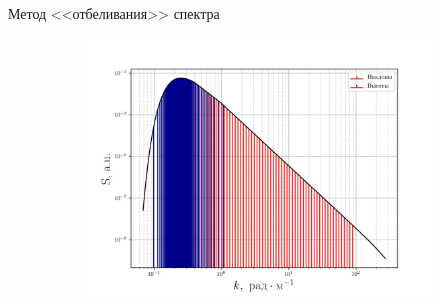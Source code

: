 \documentclass[10pt,pdf,hyperref={unicode}, dvipsnames]{beamer}
\begin{document}
\begin{frame}[t]{Метод <<отбеливания>> спектра}
\begin{figure}[h!]
\begin{subfigure}{0.49\linewidth}
        \includegraphics[width=\linewidth]{fig/fig3}
    \end{subfigure}
\end{figure}
    
\end{frame}
\end{document}

